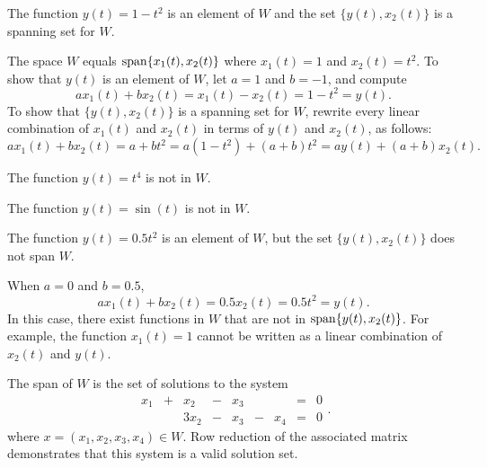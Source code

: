 \ans The function $y(t) = 1 - t^2$ is an element of $W$ and the set
$\{y(t),x_2(t)\}$ is a spanning set for $W$.



\soln The space $W$ equals ${\rm span}\{x_1(t),x_2(t)\}$ where $x_1(t)=1$ and 
$x_2(t)=t^2$.  To show that $y(t)$ is an element of $W$, let
$a = 1$ and $b = -1$, and compute
\[
ax_1(t) + bx_2(t) = x_1(t) - x_2(t) = 1 - t^2 = y(t). 
\]
To show that $\{y(t),x_2(t)\}$ is a spanning set for $W$, rewrite every
linear combination of $x_1(t)$ and $x_2(t)$ in terms of $y(t)$ and $x_2(t)$, 
as follows:
\[ 
ax_1(t) + bx_2(t) = a + bt^2 = a(1 - t^2) + (a + b)t^2
= ay(t) + (a + b)x_2(t). 
\]

 The function $y(t) = t^4$ is not in $W$.

 The function $y(t) = \sin(t)$ is not in $W$.

\ans The function $y(t) = 0.5t^2$ is an element of $W$, but the set
$\{y(t),x_2(t)\}$ does not span $W$.

\soln When $a = 0$ and $b = 0.5$,
\[ 
ax_1(t) + bx_2(t) = 0.5x_2(t) = 0.5t^2 = y(t). 
\]
In this case, there exist functions in $W$ that are not in 
${\rm span}\{y(t),x_2(t)\}$.  For example, the function $x_1(t) = 1$ cannot
be written as a linear combination of $x_2(t)$ and $y(t)$.

\ans The span of $W$ is the set of solutions to the system
\[ 
\begin{array}{rrrrrrrrr}
x_1 & + & x_2 & - & x_3 & & & = & 0 \\
& & 3x_2 & - & x_3 & - & x_4 & = & 0 \end{array}. 
\]
where $x = (x_1,x_2,x_3,x_4) \in W$.  Row reduction of the associated
matrix demonstrates that this system is a valid solution set.

